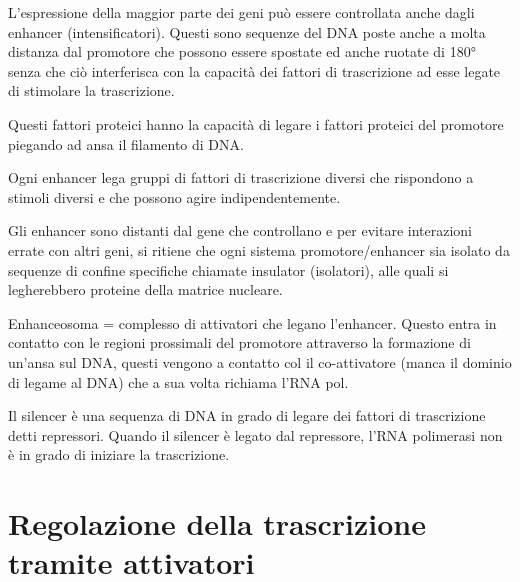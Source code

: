 \documentclass[11pt]{book}
\begin{document}
L'espressione della maggior parte dei geni può essere controllata anche
dagli enhancer (intensificatori). Questi sono sequenze del DNA poste
anche a molta distanza dal promotore che possono essere spostate ed
anche ruotate di 180° senza che ciò interferisca con la capacità dei
fattori di trascrizione ad esse legate di stimolare la trascrizione.

Questi fattori proteici hanno la capacità di legare i fattori proteici
del promotore piegando ad ansa il filamento di DNA.

Ogni enhancer lega gruppi di fattori di trascrizione diversi che
rispondono a stimoli diversi e che possono agire indipendentemente.

Gli enhancer sono distanti dal gene che controllano e per evitare
interazioni errate con altri geni, si ritiene che ogni sistema
promotore/enhancer sia isolato da sequenze di confine specifiche
chiamate insulator (isolatori), alle quali si legherebbero proteine
della matrice nucleare.

Enhanceosoma = complesso di attivatori che legano l'enhancer. Questo
entra in contatto con le regioni prossimali del promotore attraverso la
formazione di un'ansa sul DNA, questi vengono a contatto col il
co-attivatore (manca il dominio di legame al DNA) che a sua volta
richiama l'RNA pol.

Il silencer è una sequenza di DNA in grado di legare dei fattori di
trascrizione detti repressori. Quando il silencer è legato dal
repressore, l'RNA polimerasi non è in grado di iniziare la trascrizione.

\section{Regolazione della trascrizione tramite
attivatori}\label{regolazione-della-trascrizione-tramite-attivatori}
\end{document}
